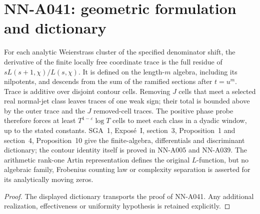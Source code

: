 \section{NN-A041: geometric formulation and dictionary}
\begin{geometricstatement}[NN-A041]
For each analytic Weierstrass cluster of the specified denominator shift, the derivative of the finite locally free coordinate trace is the full residue of $sL(s+1,\chi)/L(s,\chi)$. It is defined on the length-$m$ algebra, including its nilpotents, and descends from the sum of the ramified sections after $t=u^m$. Trace is additive over disjoint contour cells. Removing $J$ cells that meet a selected real normal-jet class leaves traces of one weak sign; their total is bounded above by the outer trace and the $J$ removed-cell traces. The positive phase probe therefore forces at least $T^{1-\varepsilon}\log T$ cells to meet each class in a dyadic window, up to the stated constants. SGA~1, Expos\'e~I, section~3, Proposition~1 and section~4, Proposition~10 give the finite-algebra, differentials and discriminant dictionary; the contour identity itself is proved in NN-A005 and NN-A039. The arithmetic rank-one Artin representation defines the original $L$-function, but no algebraic family, Frobenius counting law or complexity separation is asserted for its analytically moving zeros.
\end{geometricstatement}
\begin{proof} The displayed dictionary transports the proof of NN-A041. Any additional realization, effectiveness or uniformity hypothesis is retained explicitly.\end{proof}


